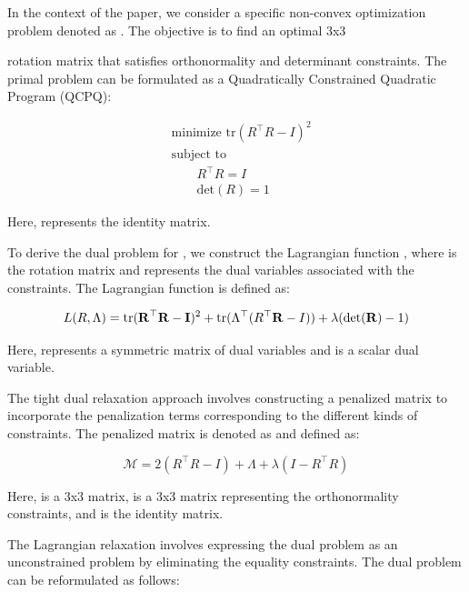 In the context of the paper, we consider a specific non-convex optimization problem denoted as . The objective is to find an optimal 3x3

 rotation matrix  that satisfies orthonormality and determinant constraints. The primal problem  can be formulated as a Quadratically Constrained Quadratic Program (QCPQ):

\begin{align*}
	& \text{minimize } \text{tr}(R^\top R - I)^2 \\
	& \text{subject to } \\
	& \quad\quad R^\top R = I \\
	& \quad\quad \text{det}(R) = 1
\end{align*}


Here,  represents the identity matrix.

To derive the dual problem for , we construct the Lagrangian function , where  is the rotation matrix and \mvar{\Lambda} represents the dual variables associated with the constraints. The Lagrangian function is defined as:

\begin{equation}
	L(R, \Lambda) = \text{tr}(\bm{\mathrm{R}}^\top \bm{\mathrm{R}} - \bm{\mathrm{I}})^2 + \text{tr}(\Lambda^\top (R^\top \bm{\mathrm{R}} - I)) + \lambda(\text{det}(\bm{\mathrm{R}}) - 1)
\end{equation}


Here, \mvar{\Lambda} represents a symmetric matrix of dual variables and \mvar{\lambda} is a scalar dual variable.

The tight dual relaxation approach involves constructing a penalized matrix to incorporate the penalization terms corresponding to the different kinds of constraints. The penalized matrix is denoted as  and defined as:

\begin{equation}
	\mathcal{M} = 2(R^\top R - I) + \Lambda + \lambda(I - R^\top R)
\end{equation}


Here,  is a 3x3 matrix,  is a 3x3 matrix representing the orthonormality constraints, and  is the identity matrix.

The Lagrangian relaxation involves expressing the dual problem as an unconstrained problem by eliminating the equality constraints. The dual problem can be reformulated as follows:

